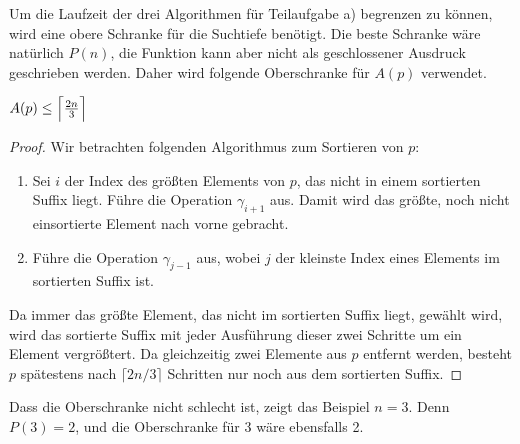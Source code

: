 \documentclass[a4paper, 11pt, ngerman]{article}
\begin{document}
Um die Laufzeit der drei Algorithmen für Teilaufgabe a) begrenzen zu können, wird eine obere Schranke für die Suchtiefe benötigt. Die beste Schranke wäre natürlich $P(n)$, die Funktion kann aber nicht als geschlossener Ausdruck geschrieben werden. Daher wird folgende Oberschranke für $A(p)$ verwendet.

\begin{lemma}
    $A(p) \le \Big{\lceil} \frac {2n} 3 \Big{\rceil}$
\end{lemma}

\begin{proof}
    Wir betrachten folgenden Algorithmus zum Sortieren von $p$:
    \begin{enumerate}
        \item Sei $i$ der Index des größten Elements von $p$, das nicht in einem sortierten Suffix liegt. Führe die Operation $\gamma_{i+1}$ aus. Damit wird das größte, noch nicht einsortierte Element nach vorne gebracht.
        \item Führe die Operation $\gamma_{j-1}$ aus, wobei $j$ der kleinste Index eines Elements im sortierten Suffix ist.
    \end{enumerate}
    Da immer das größte Element, das nicht im sortierten Suffix liegt, gewählt wird, wird das sortierte Suffix mit jeder Ausführung dieser zwei Schritte um ein Element vergrößtert. Da gleichzeitig zwei Elemente aus $p$ entfernt werden, besteht $p$ spätestens nach $\lceil 2n / 3 \rceil$ Schritten nur noch aus dem sortierten Suffix.
\end{proof}

Dass die Oberschranke nicht schlecht ist, zeigt das Beispiel $n = 3$. Denn $P(3) = 2$, und die Oberschranke für 3 wäre ebensfalls 2.
\end{document}
